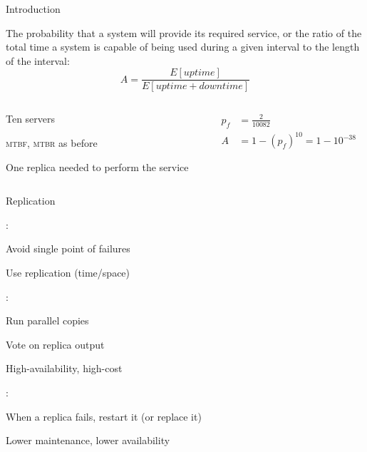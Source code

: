 \begin{frame}{Introduction}
	
\begin{definition}[Availability]
The probability that a system will provide its required service, or the ratio
of the total time a system is capable of being used during a given interval to
the length of the interval:
\[
  A = \frac{E[\mathit{uptime}]}{E[\mathit{uptime} + \mathit{downtime}] }
\]
\end{definition}

\begin{example}
\begin{columns}[t]
\begin{column}{0.55\textwidth}
\BI
\item Ten servers
\item \textsc{mtbf}, \textsc{mtbr} as before
\item One replica needed to perform the service
\EI
\end{column}
\begin{column}{0.45\textwidth}
\pause
\begin{align*}
  p_f &= \frac{2}{10082}\\
  A &= 1 -(p_f)^{10} = 1-10^{-38}
\end{align*}
\end{column}
\end{columns}
\end{example}

\end{frame}

\begin{frame}{Replication}
	
:

\BI
\item Avoid single point of failures
\item Use replication (time/space)
\EI

:
\BI
\item Run parallel copies 
\item Vote on replica output
\item High-availability, high-cost
\EI

:
\BI
\item When a replica fails, restart it (or replace it)
\item Lower maintenance, lower availability
\EI

\end{frame}

